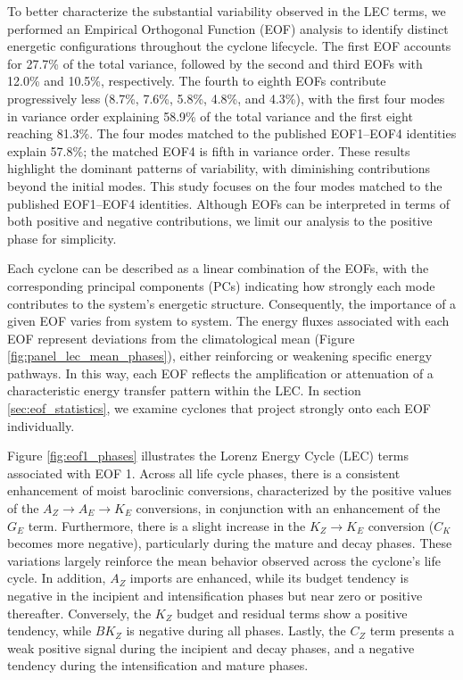 \documentclass[pdflatex,sn-chicago]{sn-jnl}%
\theoremstyle{plain}
\theoremstyle{definition}
\theoremstyle{remark}
\theoremstyle{definition}
\begin{document}
To better characterize the substantial variability observed in the LEC terms, we performed an Empirical Orthogonal Function (EOF) analysis to identify distinct energetic configurations throughout the cyclone lifecycle. The first EOF accounts for 27.7\% of the total variance, followed by the second and third EOFs with 12.0\% and 10.5\%, respectively. The fourth to eighth EOFs contribute progressively less (8.7\%, 7.6\%, 5.8\%, 4.8\%, and 4.3\%), with the first four modes in variance order explaining 58.9\% of the total variance and the first eight reaching 81.3\%. The four modes matched to the published EOF1--EOF4 identities explain 57.8\%; the matched EOF4 is fifth in variance order. These results highlight the dominant patterns of variability, with diminishing contributions beyond the initial modes. This study focuses on the four modes matched to the published EOF1--EOF4 identities. Although EOFs can be interpreted in terms of both positive and negative contributions, we limit our analysis to the positive phase for simplicity.

Each cyclone can be described as a linear combination of the EOFs, with the corresponding principal components (PCs) indicating how strongly each mode contributes to the system’s energetic structure. Consequently, the importance of a given EOF varies from system to system. The energy fluxes associated with each EOF represent deviations from the climatological mean (Figure \ref{fig:panel_lec_mean_phases}), either reinforcing or weakening specific energy pathways. In this way, each EOF reflects the amplification or attenuation of a characteristic energy transfer pattern within the LEC. In section \ref{sec:eof_statistics}, we examine cyclones that project strongly onto each EOF individually.

Figure \ref{fig:eof1_phases} illustrates the Lorenz Energy Cycle (LEC) terms associated with EOF 1. Across all life cycle phases, there is a consistent enhancement of moist baroclinic conversions, characterized by the positive values of the $A_Z \rightarrow A_E \rightarrow K_E$ conversions, in conjunction with an enhancement of the $G_E$ term. Furthermore, there is a slight increase in the $K_Z \rightarrow K_E$ conversion ($C_K$ becomes more negative), particularly during the mature and decay phases. These variations largely reinforce the mean behavior observed across the cyclone's life cycle. In addition, $A_Z$ imports are enhanced, while its budget tendency is negative in the incipient and intensification phases but near zero or positive thereafter. Conversely, the $K_Z$  budget and residual terms show a positive tendency, while $BK_Z$ is negative during all phases. Lastly, the $C_Z$ term presents a weak positive signal during the incipient and decay phases, and a negative tendency during the intensification and mature phases.
\end{document}
